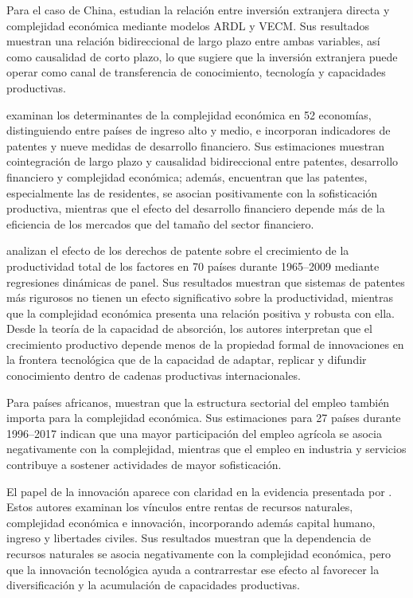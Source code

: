 \documentclass[../../TFM.tex]{subfiles}
\begin{document}
	Para el caso de China, \textcite{Khan2020} estudian la relación entre inversión extranjera directa y complejidad económica mediante modelos ARDL y VECM. Sus resultados muestran una relación bidireccional de largo plazo entre ambas variables, así como causalidad de corto plazo, lo que sugiere que la inversión extranjera puede operar como canal de transferencia de conocimiento, tecnología y capacidades productivas. 

	\textcite{Nguyen2020} examinan los determinantes de la complejidad económica en 52 economías, distinguiendo entre países de ingreso alto y medio, e incorporan indicadores de patentes y nueve medidas de desarrollo financiero. Sus estimaciones muestran cointegración de largo plazo y causalidad bidireccional entre patentes, desarrollo financiero y complejidad económica; además, encuentran que las patentes, especialmente las de residentes, se asocian positivamente con la sofisticación productiva, mientras que el efecto del desarrollo financiero depende más de la eficiencia de los mercados que del tamaño del sector financiero.

	\textcite{Sweet2019} analizan el efecto de los derechos de patente sobre el crecimiento de la productividad total de los factores en 70 países durante 1965--2009 mediante regresiones dinámicas de panel. Sus resultados muestran que sistemas de patentes más rigurosos no tienen un efecto significativo sobre la productividad, mientras que la complejidad económica presenta una relación positiva y robusta con ella. Desde la teoría de la capacidad de absorción, los autores interpretan que el crecimiento productivo depende menos de la propiedad formal de innovaciones en la frontera tecnológica que de la capacidad de adaptar, replicar y difundir conocimiento dentro de cadenas productivas internacionales.

	Para países africanos, \textcite{KetuNingaye2024} muestran que la estructura sectorial del empleo también importa para la complejidad económica. Sus estimaciones para 27 países durante 1996--2017 indican que una mayor participación del empleo agrícola se asocia negativamente con la complejidad, mientras que el empleo en industria y servicios contribuye a sostener actividades de mayor sofisticación.
	
	El papel de la innovación aparece con claridad en la evidencia presentada por \textcite{Alvarado2023}. Estos autores examinan los vínculos entre rentas de recursos naturales, complejidad económica e innovación, incorporando además capital humano, ingreso y libertades civiles. Sus resultados muestran que la dependencia de recursos naturales se asocia negativamente con la complejidad económica, pero que la innovación tecnológica ayuda a contrarrestar ese efecto al favorecer la diversificación y la acumulación de capacidades productivas.
	
\end{document}
